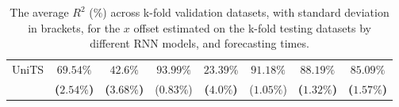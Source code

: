 \begin{table}[!ht]
{\begin{tabular}{|c|c|c|c|c|c|c|c|}
			\multirow{2}{*}{UniTS} & $\mathbf{69.54\%}$ & $\mathbf{42.6\%}$ & $93.99\%$ & $\mathbf{23.39\%}$ & $91.18\%$ & $\mathbf{88.19\%}$ & $\mathbf{85.09\%}$ \\
			 & \textbf{(}$\mathbf{2.54\%}$\textbf{)} & \textbf{(}$\mathbf{3.68\%}$\textbf{)} & ($0.83\%$) & \textbf{(}$\mathbf{4.0\%}$\textbf{)} & ($1.05\%$) & \textbf{(}$\mathbf{1.32\%}$\textbf{)} & \textbf{(}$\mathbf{1.57\%}$\textbf{)} \\ \hline
		\end{tabular}
	}
	\caption{The average $R^{2}$ (\%) across k-fold validation datasets, with standard deviation in brackets, for the $x$ offset estimated on the k-fold testing datasets by different RNN models, and forecasting times.}
	\label{tab:all_longitude_no_abs_R2}
\end{table}